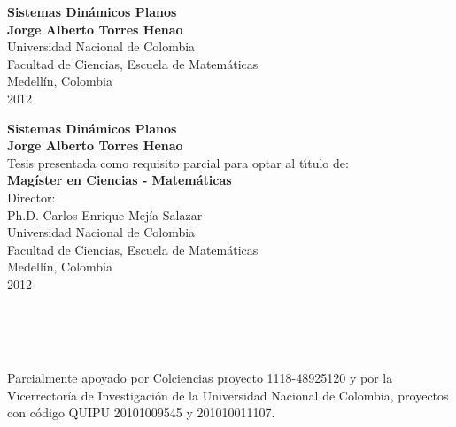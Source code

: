\begin{center}
\begin{figure}
\centering
{}
\end{figure}
\thispagestyle{empty} \vspace*{2.0cm} \textbf{\huge
Sistemas Dinámicos Planos}\\[6.0cm]
\Large\textbf{Jorge Alberto Torres Henao}\\[6.0cm]
\small Universidad Nacional de Colombia\\
Facultad de Ciencias, Escuela de Matemáticas\\
Medellín, Colombia\\
2012\\
\end{center}

\newpage{\pagestyle{empty}\cleardoublepage}

\newpage
\begin{center}
\thispagestyle{empty} \vspace*{0cm} \textbf{\huge
Sistemas Dinámicos Planos}\\[3.0cm]
\Large\textbf{Jorge Alberto Torres Henao}\\[3.0cm]
\small Tesis presentada como requisito parcial para optar al
t\'{\i}tulo de:\\
\textbf{Magíster en Ciencias - Matemáticas}\\[2.5cm]
Director:\\
Ph.D. Carlos Enrique Mejía Salazar\\[4.5cm]
Universidad Nacional de Colombia\\
Facultad de Ciencias, Escuela de Matemáticas\\
Medellín, Colombia\\
2012\\
\end{center}

\newpage{\pagestyle{empty}\cleardoublepage}

\thispagestyle{empty} \textbf{}\normalsize
\\\\\\%

\null
\vfill
\begin{flushright}
\begin{minipage}{10.5cm}
    \noindent
    {\small
Parcialmente apoyado por Colciencias proyecto 1118-48925120 y por la Vicerrectoría de Investigación de la Universidad Nacional de Colombia, proyectos con código QUIPU 20101009545 y 201010011107.		
	}
\end{minipage}
\end{flushright}


